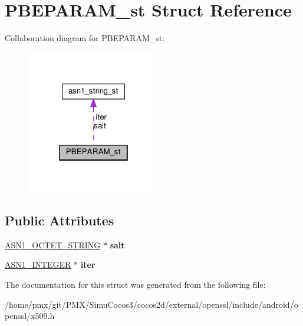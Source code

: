 \hypertarget{structPBEPARAM__st}{}\section{P\+B\+E\+P\+A\+R\+A\+M\+\_\+st Struct Reference}
\label{structPBEPARAM__st}


Collaboration diagram for P\+B\+E\+P\+A\+R\+A\+M\+\_\+st\+:
\nopagebreak
\begin{figure}[H]
\begin{center}
\leavevmode
\includegraphics[width=166pt]{structPBEPARAM__st__coll__graph}
\end{center}
\end{figure}
\subsection*{Public Attributes}
\begin{DoxyCompactItemize}
\item 
\mbox{\label{structPBEPARAM__st_af0717e1b2e50c0a82267db9a408c84eb}} 
\hyperlink{structasn1__string__st}{A\+S\+N1\+\_\+\+O\+C\+T\+E\+T\+\_\+\+S\+T\+R\+I\+NG} $\ast$ {\bfseries salt}
\item 
\mbox{\label{structPBEPARAM__st_a03bda639286f0c4740583a55d49ea722}} 
\hyperlink{structasn1__string__st}{A\+S\+N1\+\_\+\+I\+N\+T\+E\+G\+ER} $\ast$ {\bfseries iter}
\end{DoxyCompactItemize}


The documentation for this struct was generated from the following file\+:\begin{DoxyCompactItemize}
\item 
/home/pmx/git/\+P\+M\+X/\+Simu\+Cocos3/cocos2d/external/openssl/include/android/openssl/x509.\+h\end{DoxyCompactItemize}
